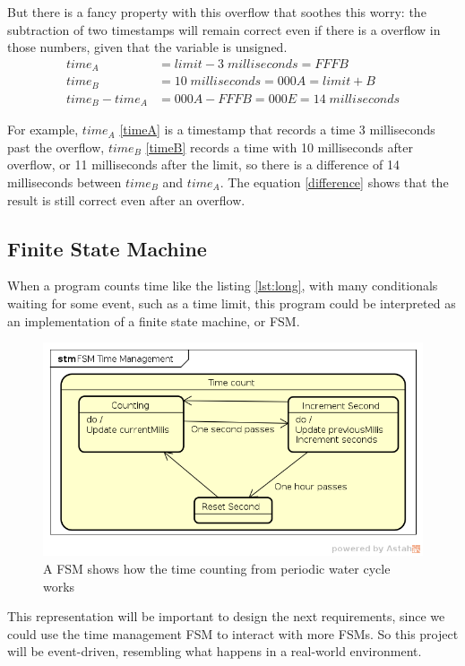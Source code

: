 But there is a fancy property with this overflow that soothes this worry:
the subtraction of two timestamps will remain correct even if there is a overflow in those numbers,
given that the variable is unsigned.
\begin{align}
    time_A &=limit - 3\;milliseconds =FFFB  \label{timeA} \\ 
    time_B &= 10\;milliseconds =000A =limit + B  \label{timeB} \\ 
    time_B - time_A &= 000A - FFFB =000E =14\;milliseconds \label{difference}
\end{align}

For example,
$time_A$ \eqref{timeA} is a timestamp that records a time 3 milliseconds past the overflow,
$time_B$ \eqref{timeB} records a time with 10 milliseconds after overflow,
or 11 milliseconds after the limit,
so there is a difference of 14 milliseconds between $time_B$ and $time_A$.
The equation \eqref{difference} shows that the result is still correct even after an overflow.

\subsection{Finite State Machine}
When a program counts time like the listing \ref{lst:long},
with many conditionals waiting for some event,
such as a time limit,
this program could be interpreted as an implementation of a finite state machine,
or FSM.

\begin{figure}[h]
    \centering
    \includegraphics[width=.7\textwidth]{diagrams/FSM_TM.png}
    \caption{A FSM shows how the time counting from periodic water cycle works}
    \label{fig:fsm_tm}
\end{figure}

This representation will be important to design the next requirements,
since we could use the time management FSM to interact with more FSMs.
So this project will be event-driven,
resembling what happens in a real-world environment.

